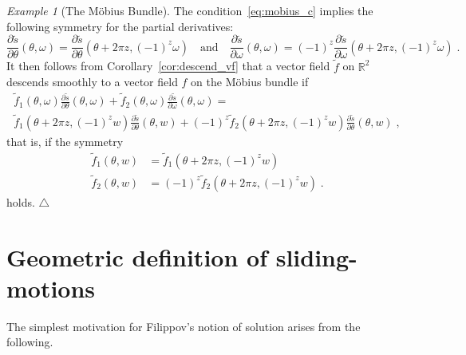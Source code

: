 \documentclass{article}
\theoremstyle{definition}
\theoremstyle{remark}
\newtheorem{example}{Example}
\newcommand\xqed[1]{%
  \leavevmode\unskip\penalty9999 \hbox{}\nobreak\hfill
  \quad\hbox{#1}}
\newcommand\eexa{\xqed{$\triangle$}}
\newcommand{\RR}{\mathbb{R}}	%
\begin{document}
\begin{example}[The M\"obius Bundle]
 The condition~\eqref{eq:mobius_c} implies the following symmetry for the partial derivatives:
 \begin{displaymath}
  \frac{\partial \tilde{s}}{\partial \theta}(\theta,\omega) = 
   \frac{\partial \tilde{s}}{\partial \theta}(\theta+2\pi z,(-1)^z \omega) 
  \quad \text{and} \quad
  \frac{\partial \tilde{s}}{\partial \omega}(\theta,\omega) = (-1)^z
   \frac{\partial \tilde{s}}{\partial \omega}(\theta+2\pi z,(-1)^z \omega) \;.
 \end{displaymath}
 It then follows from Corollary~\ref{cor:descend_vf} that a vector field $\tilde{f}$ on $\RR^2$
 descends smoothly to a vector field $f$ on the M\"obius bundle if
 \begin{multline*}
  \tilde{f}_1(\theta,\omega)\frac{\partial \tilde{s}}{\partial \theta}(\theta,\omega) + 
   \tilde{f}_2(\theta,\omega)\frac{\partial \tilde{s}}{\partial \omega}(\theta,\omega) = \\
  \tilde{f}_1(\theta+2\pi z,(-1)^z w)\frac{\partial \tilde{s}}{\partial \theta}(\theta,w) + 
   (-1)^z\tilde{f}_2(\theta+2\pi z,(-1)^z w)\frac{\partial \tilde{s}}{\partial \theta}(\theta, w) \;,
 \end{multline*}
 that is, if the symmetry
 \begin{subequations} \label{eq:mobius_vf}
 \begin{align}
  \tilde{f}_1(\theta,w) &= \tilde{f}_1(\theta+2\pi z,(-1)^z w) \label{eq:cvf_theta} \\ 
  \tilde{f}_2(\theta,w) &= (-1)^z \tilde{f}_2(\theta+2\pi z,(-1)^z w) \label{eq:cvf_omega} \;.
 \end{align}
 \end{subequations}
 holds.
 \eexa
\end{example}


\section{Geometric definition of sliding-motions} \label{sec:sliding}

The simplest motivation for Filippov's notion of solution arises from the following.
\end{document}
